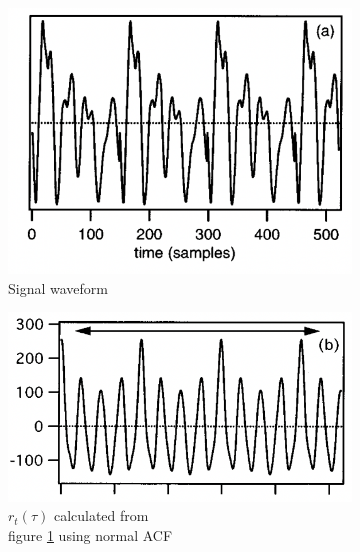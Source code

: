 \begin{enumerate}[label=\textbf{\arabic*})]
    \begin{figure}
        \centering
        \begin{subfigure}{.3\textwidth}
          \centering
          \includegraphics[width=1\linewidth]{Figures/signalwaveform.png}
          \caption{Signal waveform}
          \label{signal}
        \end{subfigure}%
        \begin{subfigure}{.3\textwidth}
            \centering
            \includegraphics[width=1\linewidth]{Figures/acf.png}
            \caption{$r_t(\tau)$ calculated from \\figure \cref{signal} using normal ACF}
            \label{acf}
          \end{subfigure}%
        \begin{subfigure}{.3\textwidth}
          \centering

\end{subfigure}
\end{figure}
\end{enumerate}
